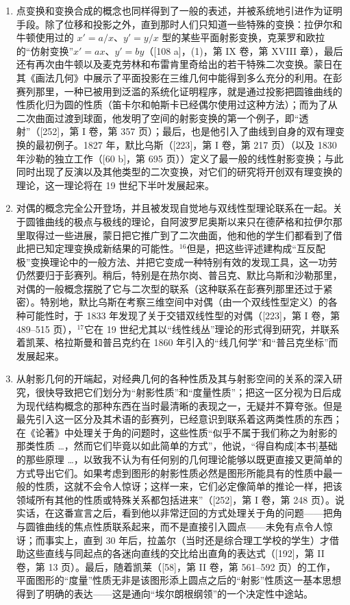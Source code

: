 \begin{enumerate}
\def\labelenumi{\Alph{enumi})}
\setcounter{enumi}{2}
\item
  点变换和变换合成的概念也同样得到了一般的表述，并被系统地引进作为证明手段。除了位移和投影之外，直到那时人们只知道一些特殊的变换：拉伊尔和牛顿使用过的 \(x' = a / x\)、\(y' = y / x\) 型的某些平面射影变换，克莱罗和欧拉的“仿射变换”\(x' = ax\)、\(y' = by\)（{[}108 a{]}，(1)，第 IX 卷，第 XVIII 章），最后还有再次由牛顿以及麦克劳林和布雷肯里奇给出的若干特殊二次变换。蒙日在其《画法几何》中展示了平面投影在三维几何中能得到多么充分的利用。在彭赛列那里，一种已被用到泛滥的系统化证明程序，就是通过投影把圆锥曲线的性质化归为圆的性质（笛卡尔和帕斯卡已经偶尔使用过这种方法）；而为了从二次曲面过渡到球面，他发明了空间的射影变换的第一个例子，即“透射”（{[}252{]}，第 I 卷，第 357 页）；最后，也是他引入了曲线到自身的双有理变换的最初例子。1827 年，默比乌斯（{[}223{]}，第 I 卷，第 217 页）（以及 1830 年沙勒的独立工作（{[}60 b{]}，第 695 页））定义了最一般的线性射影变换；与此同时出现了反演以及其他类型的二次变换，对它们的研究将开创双有理变换的理论，这一理论将在 19 世纪下半叶发展起来。
\item
  对偶的概念完全公开登场，并且被发现自觉地与双线性型理论联系在一起。关于圆锥曲线的极点与极线的理论，自阿波罗尼奥斯以来只在德萨格和拉伊尔那里取得过一些进展，蒙日把它推广到了二次曲面，他和他的学生们都看到了借此把已知定理变换成新结果的可能性。\(^{16}\)但是，把这些评述建构成“互反配极”变换理论中的一般方法、并把它变成一种特别有效的发现工具，这一功劳仍然要归于彭赛列。稍后，特别是在热尔岗、普吕克、默比乌斯和沙勒那里，对偶的一般概念摆脱了它与二次型的联系（这种联系在彭赛列那里还过于紧密）。特别地，默比乌斯在考察三维空间中对偶（由一个双线性型定义）的各种可能性时，于 1833 年发现了关于交错双线性型的对偶（{[}223{]}，第 I 卷，第 489–515 页），\(^{17}\)它在 19 世纪尤其以“线性线丛”理论的形式得到研究，并联系着凯莱、格拉斯曼和普吕克约在 1860 年引入的“线几何学”和“普吕克坐标”而发展起来。
\item
  从射影几何的开端起，对经典几何的各种性质及其与射影空间的关系的深入研究，很快导致把它们划分为“射影性质”和“度量性质”；把这一区分视为日后成为现代结构概念的那种东西在当时最清晰的表现之一，无疑并不算夸张。但是最先引入这一区分及其术语的彭赛列，已经意识到联系着这两类性质的东西；在《论著》中处理关于角的问题时，这些性质“似乎不属于我们称之为射影的那类性质 \ldots，然而它们毕竟以如此简单的方式”，他说，“得自构成{[}本书{]}基础的那些原理 \ldots，以致我不认为有任何别的几何理论能够以既更直接又更简单的方式导出它们。如果考虑到图形的射影性质必然是图形所能具有的性质中最一般的性质，这就不会令人惊讶；这样一来，它们必定像简单的推论一样，把该领域所有其他的性质或特殊关系都包括进来”（{[}252{]}，第 I 卷，第 248 页）。说实话，在这番宣言之后，看到他以非常迂回的方式处理关于角的问题——把角与圆锥曲线的焦点性质联系起来，而不是直接引入圆点——未免有点令人惊讶；而事实上，直到 30 年后，拉盖尔（当时还是综合理工学校的学生）才借助这些直线与同起点的各迷向直线的交比给出直角的表达式（{[}192{]}，第 II 卷，第 13 页）。最后，随着凯莱（{[}58{]}，第 II 卷，第 561–592 页）的工作，平面图形的“度量”性质无非是该图形添上圆点之后的“射影”性质这一基本思想得到了明确的表达——这是通向“埃尔朗根纲领”的一个决定性中途站。

\end{enumerate}
